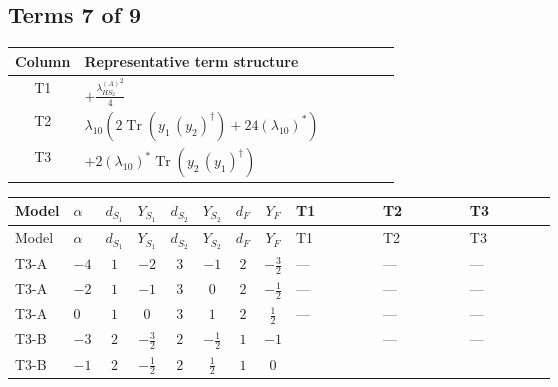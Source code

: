 \documentclass[8pt]{article}
\begin{document}
\begin{landscape}
\subsection*{Terms 7 of 9}
\begin{center}
\begin{tabular}{@{}c >{\raggedright\arraybackslash}p{0.82\linewidth}@{}}
\toprule
Column & Representative term structure \\
\midrule
T1 & \(\displaystyle +\frac{{\lambda_{HS_2}^{(A)}}^2}{4}\) \\
\midrule
T2 & \(\displaystyle {\lambda_{10}} (2 \operatorname{Tr}\!\left({y_1}\,\left({y_2}\right)^{\dagger}\right)+24 \left({\lambda_{10}}\right)^{*})\) \\
\midrule
T3 & \(\displaystyle +2 \left({\lambda_{10}}\right)^{*} \operatorname{Tr}\!\left({y_2}\,\left({y_1}\right)^{\dagger}\right)\) \\
\midrule
\bottomrule
\end{tabular}
\end{center}
\smallskip
\tiny
\begin{longtable}{@{}llcccccc >{\raggedright\arraybackslash}p{0.21\linewidth} >{\raggedright\arraybackslash}p{0.21\linewidth} >{\raggedright\arraybackslash}p{0.21\linewidth}@{}}
\toprule
Model & $\alpha$ & $d_{S_1}$ & $Y_{S_1}$ & $d_{S_2}$ & $Y_{S_2}$ & $d_F$ & $Y_F$ & T1 & T2 & T3 \\
\midrule
\endfirsthead
\toprule
Model & $\alpha$ & $d_{S_1}$ & $Y_{S_1}$ & $d_{S_2}$ & $Y_{S_2}$ & $d_F$ & $Y_F$ & T1 & T2 & T3 \\
\midrule
\endhead
T3-A & $-4$ & $1$ & $-2$ & $3$ & $-1$ & $2$ & $-\frac{3}{2}$ & --- & --- & --- \\
\midrule
T3-A & $-2$ & $1$ & $-1$ & $3$ & $0$ & $2$ & $-\frac{1}{2}$ & --- & --- & --- \\
\midrule
T3-A & $0$ & $1$ & $0$ & $3$ & $1$ & $2$ & $\frac{1}{2}$ & --- & --- & --- \\
\midrule
T3-B & $-3$ & $2$ & $-\frac{3}{2}$ & $2$ & $-\frac{1}{2}$ & $1$ & $-1$ & \scriptsize\adjustbox{max width=\linewidth}{$\begin{gathered} +\frac{{\lambda_{HS_2}^{(A)}}^2}{4}\end{gathered}$} & --- & --- \\
\midrule
T3-B & $-1$ & $2$ & $-\frac{1}{2}$ & $2$ & $\frac{1}{2}$ & $1$ & $0$ & \scriptsize\adjustbox{max width=\linewidth}{$\begin{gathered} +\frac{{\lambda_{HS_2}^{(A)}}^2}{4}\end{gathered}$} & \scriptsize\adjustbox{max width=\linewidth}{$\begin{gathered} {\lambda_{10}} (2 \operatorname{Tr}\!\left({y_1}\,\left({y_2}\right)^{\dagger}\right)+24 \left({\lambda_{10}}\right)^{*})\end{gathered}$} & \scriptsize\adjustbox{max width=\linewidth}{$\begin{gathered} +2 \left({\lambda_{10}}\right)^{*} \operatorname{Tr}\!\left({y_2}\,\left({y_1}\right)^{\dagger}\right)\end{gathered}$} \\

\end{longtable}
\end{landscape}
\end{document}
